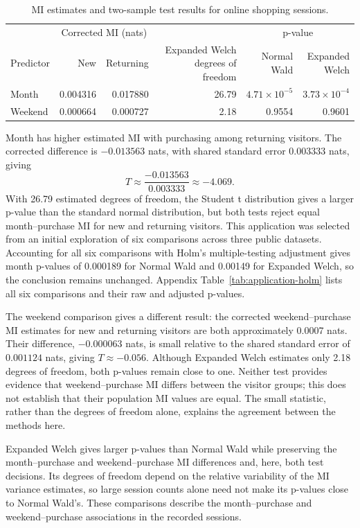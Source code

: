 \begin{table}[H]
\centering
\caption{MI estimates and two-sample test results for online shopping sessions.}
\label{tab:shoppers-application}
\begingroup
\setlength{\tabcolsep}{4pt}
\begin{tabular}{@{}lrrrrr@{}}
\toprule
 & \multicolumn{2}{c}{Corrected MI (nats)} & & \multicolumn{2}{c}{p-value}\\
\cmidrule(lr){2-3}\cmidrule(l){5-6}
Predictor & New & Returning & \shortstack{Expanded Welch\\degrees of freedom}
 & \shortstack{Normal\\Wald} & \shortstack{Expanded\\Welch}\\
\midrule
Month & 0.004316 & 0.017880 & 26.79 & \(4.71\times10^{-5}\) & \(3.73\times10^{-4}\)\\
Weekend & 0.000664 & 0.000727 & 2.18 & 0.9554 & 0.9601\\
\bottomrule
\end{tabular}
\endgroup
\end{table}

Month has higher estimated MI with purchasing among returning visitors.
The corrected difference is \(-0.013563\) nats, with shared standard error
\(0.003333\) nats, giving
\begin{equation}
  T\approx\frac{-0.013563}{0.003333}\approx-4.069.
  \label{eq:shoppers-month-statistic}
\end{equation}
With 26.79 estimated degrees of freedom, the Student t distribution gives
a larger p-value than the standard normal distribution, but both tests
reject equal month--purchase MI for new and returning visitors. This
application was selected from an initial exploration
of six comparisons across three public datasets. Accounting for all six
comparisons with Holm's multiple-testing adjustment \citep{holm1979}
gives month p-values of 0.000189 for Normal Wald and 0.00149 for Expanded
Welch, so the conclusion remains unchanged. Appendix
Table~\ref{tab:application-holm} lists all six comparisons and their raw
and adjusted p-values.

The weekend comparison gives a different result: the corrected
weekend--purchase MI estimates for new and returning visitors are both
approximately 0.0007 nats. Their difference,
\(-0.000063\) nats, is small relative to the shared standard error of
\(0.001124\) nats, giving \(T\approx-0.056\). Although Expanded Welch
estimates only 2.18 degrees of freedom, both p-values remain close to one.
Neither test provides evidence that weekend--purchase MI differs between
the visitor groups; this does not establish that their population MI
values are equal. The small statistic, rather than the degrees of freedom
alone, explains the agreement between the methods here.

Expanded Welch gives larger p-values than Normal Wald while preserving the
month--purchase and weekend--purchase MI differences and, here, both test
decisions. Its degrees of freedom depend on the relative variability of
the MI variance estimates, so large session counts alone need not make its
p-values close to Normal Wald's. These comparisons describe the
month--purchase and weekend--purchase associations in the recorded sessions.
